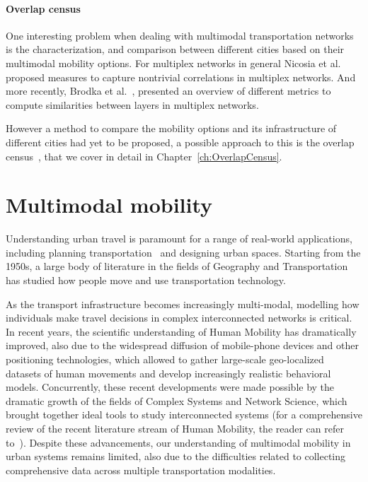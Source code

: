 \paragraph*{Overlap census}\label{overlap}
One interesting problem when dealing with multimodal transportation networks is the characterization, and comparison between different cities based on their multimodal mobility options. For multiplex networks in general Nicosia et al.~\cite{nicosia2015measuring} proposed measures to capture nontrivial correlations in multiplex networks. And more recently, Brodka et al.~\cite{brodka2017similarity}, presented an overview of different metrics to compute similarities between layers in multiplex networks.

However a method to compare the mobility options and its infrastructure of different cities had yet to be proposed, a possible approach to this is the overlap census~\cite{natera2020multimodal}, that we cover in detail in Chapter~\ref{ch:OverlapCensus}.


\section{Multimodal mobility}\label{sec:multimodalmobility}

Understanding urban travel is paramount for a range of real-world applications, including planning transportation~\cite{patriksson2015traffic} and designing urban spaces. Starting from the 1950s, a large body of literature in the fields of Geography and Transportation has studied how people move and use transportation technology. 

As the transport infrastructure becomes increasingly multi-modal, modelling how individuals make travel decisions in complex interconnected networks is critical. In recent years, the scientific understanding of Human Mobility has dramatically improved, also due to the widespread diffusion of mobile-phone devices and other positioning technologies, which allowed to gather large-scale geo-localized datasets of human movements and develop increasingly realistic behavioral models. Concurrently, these recent developments were made possible by the dramatic growth of the fields of Complex Systems and Network Science, which brought together ideal tools to study interconnected systems (for a comprehensive review of the recent literature stream of Human Mobility, the reader can refer to~\cite{barbosa2018human}). Despite these advancements, our understanding of multimodal mobility in urban systems remains limited, also due to the difficulties related to collecting comprehensive data across multiple transportation modalities. 

